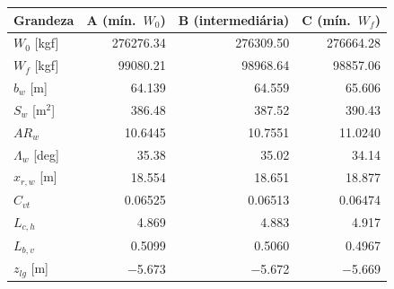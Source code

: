 \begin{tabular}{lrrr}
\toprule
Grandeza & A (mín.\ $W_0$) & B (intermediária) & C (mín.\ $W_f$) \\
\midrule
$W_0$ [kgf] & 276276.34 & 276309.50 & 276664.28 \\
$W_f$ [kgf] & 99080.21 & 98968.64 & 98857.06 \\
$b_w$ [m] & 64.139 & 64.559 & 65.606 \\
$S_w$ [m$^2$] & 386.48 & 387.52 & 390.43 \\
$AR_w$ & 10.6445 & 10.7551 & 11.0240 \\
$\Lambda_w$ [deg] & 35.38 & 35.02 & 34.14 \\
$x_{r,w}$ [m] & 18.554 & 18.651 & 18.877 \\
$C_{vt}$ & 0.06525 & 0.06513 & 0.06474 \\
$L_{c,h}$ & 4.869 & 4.883 & 4.917 \\
$L_{b,v}$ & 0.5099 & 0.5060 & 0.4967 \\
$z_{lg}$ [m] & $-$5.673 & $-$5.672 & $-$5.669 \\
\bottomrule
\end{tabular}